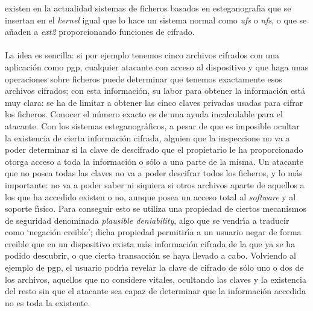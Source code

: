 existen en la actualidad sistemas de ficheros basados en esteganograf\'{\i}a que
se insertan en el {\it kernel} igual que lo hace un sistema normal como {\it
ufs} o {\it nfs}, o que se a\~naden a {\it ext2} proporcionando funciones de
cifrado.\\
\\La idea es sencilla: si por ejemplo tenemos cinco archivos cifrados con una
aplicaci\'on como {\sc pgp}, cualquier atacante con acceso al dispositivo y
que haga unas operaciones sobre ficheros puede determinar que tenemos 
exactamente esos archivos cifrados; con esta informaci\'on, su labor para 
obtener la informaci\'on est\'a muy clara: se ha de limitar a obtener las 
cinco claves privadas usadas para cifrar los ficheros. Conocer el n\'umero 
exacto es de una ayuda incalculable para el atacante. Con los sistemas
esteganogr\'aficos, a pesar de que es imposible ocultar la existencia de
cierta informaci\'on cifrada, alguien que la inspeccione no va a poder 
determinar si la clave de descifrado que el propietario le ha proporcionado 
otorga acceso a toda la informaci\'on o s\'olo a una parte de la misma. Un 
atacante que no posea todas las claves no va a poder descifrar todos los 
ficheros, y lo m\'as importante: no va a poder saber ni siquiera si otros
archivos aparte de aquellos a los que ha accedido existen o no, aunque posea un 
acceso total al {\it software} y al soporte f\'{\i}sico. Para conseguir esto
se utiliza una propiedad de ciertos mecanismos de seguridad denominada {\it
plausible deniability}, algo que se vendr\'{\i}a a traducir como `negaci\'on
creible'; dicha propiedad permitir\'{\i}a a un usuario negar de forma creible
que en un dispositivo exista m\'as informaci\'on cifrada de la que ya se ha
podido descubrir, o que cierta transacci\'on se haya llevado a cabo. Volviendo
al ejemplo de {\sc pgp}, el usuario podr\'{\i}a revelar la clave de cifrado
de s\'olo uno o dos de los archivos, aquellos que no considere vitales, 
ocultando las claves y la existencia del resto sin que el atacante sea capaz
de determinar que la informaci\'on accedida no es toda la existente.
